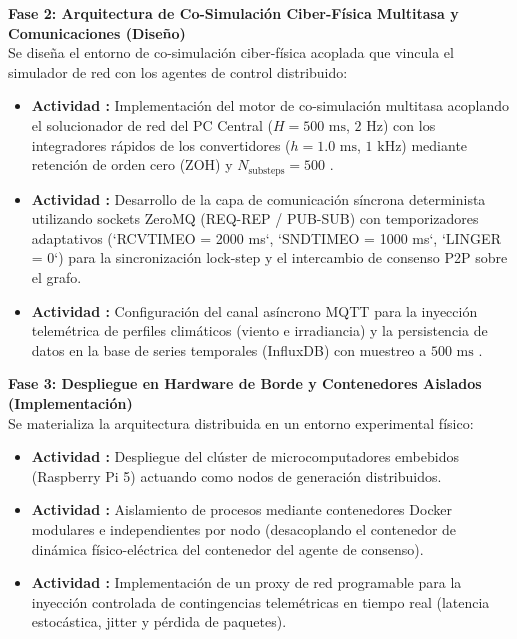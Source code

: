 \textbf{Fase 2: Arquitectura de Co-Simulación Ciber-Física Multitasa y Comunicaciones (Diseño)}\\
Se diseña el entorno de co-simulación ciber-física acoplada que vincula el simulador de red con los agentes de control distribuido:
\begin{itemize}
    \item \textbf{Actividad :} Implementación del motor de co-simulación multitasa acoplando el solucionador de red del PC Central ($H = 500\text{ ms}$, $2\text{ Hz}$) con los integradores rápidos de los convertidores ($h = 1.0\text{ ms}$, $1\text{ kHz}$) mediante retención de orden cero (ZOH) y $N_{\text{substeps}} = 500$ \citep{Liu2025Multirate, Kyllingstad2025CosimErrors, Haid2022CosimCorrector}.
    \item \textbf{Actividad :} Desarrollo de la capa de comunicación síncrona determinista utilizando sockets ZeroMQ (REQ-REP / PUB-SUB) con temporizadores adaptativos (`RCVTIMEO = 2000 ms`, `SNDTIMEO = 1000 ms`, `LINGER = 0`) para la sincronización lock-step y el intercambio de consenso P2P sobre el grafo.
    \item \textbf{Actividad :} Configuración del canal asíncrono MQTT para la inyección telemétrica de perfiles climáticos (viento e irradiancia) y la persistencia de datos en la base de series temporales (InfluxDB) con muestreo a $500\text{ ms}$ \citep{Diaz2025}.
\end{itemize}

\textbf{Fase 3: Despliegue en Hardware de Borde y Contenedores Aislados (Implementación)}\\
Se materializa la arquitectura distribuida en un entorno experimental físico:
\begin{itemize}
    \item \textbf{Actividad :} Despliegue del clúster de microcomputadores embebidos (Raspberry Pi 5) actuando como nodos de generación distribuidos.
    \item \textbf{Actividad :} Aislamiento de procesos mediante contenedores Docker modulares e independientes por nodo (desacoplando el contenedor de dinámica físico-eléctrica del contenedor del agente de consenso).
    \item \textbf{Actividad :} Implementación de un proxy de red programable para la inyección controlada de contingencias telemétricas en tiempo real (latencia estocástica, jitter y pérdida de paquetes).
\end{itemize}

